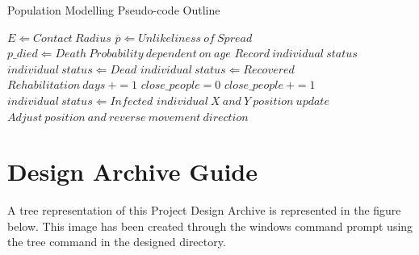 \begin{appendices}
\begin{algorithm}
\caption{Population Modelling Pseudo-code Outline}
\label{alg1}
\begin{algorithmic}[1]
  \STATE $E \Leftarrow Contact\:Radius$
  \STATE $\overline{p} \Leftarrow Unlikeliness\:of\:Spread$
  \STATE $p\_died \Leftarrow Death\:Probability\:dependent\:on\:age$
      \STATE$Record\:individual\:status$
        \STATE $individual\:status \Leftarrow Dead$
      \ELSE
          \STATE $individual\:status \Leftarrow Recovered$
        \ENDIF
        \STATE $Rehabilitation\:days\:+= 1$
      \ENDIF
        \STATE $close\_people = 0$
        \STATE $close\_people\:+= 1$
        \ENDIF
        \ENDFOR
          \STATE $individual\:status \Leftarrow Infected$
        \ENDIF
      \ENDIF
          \STATE $individual\:X\:and\:Y\:position\:update$
            \STATE $Adjust\:position\:and\:reverse\:movement\:direction$
          \ENDIF
      \ENDIF
  \ENDFOR
\ENDFOR
\end{algorithmic}
\end{algorithm}

\clearpage


\clearpage
\section{Design Archive Guide}
\label{archive}
A tree representation of this Project Design Archive is represented in the figure below. This image has been created through the windows command prompt using the tree command in the designed directory.


\end{appendices}
